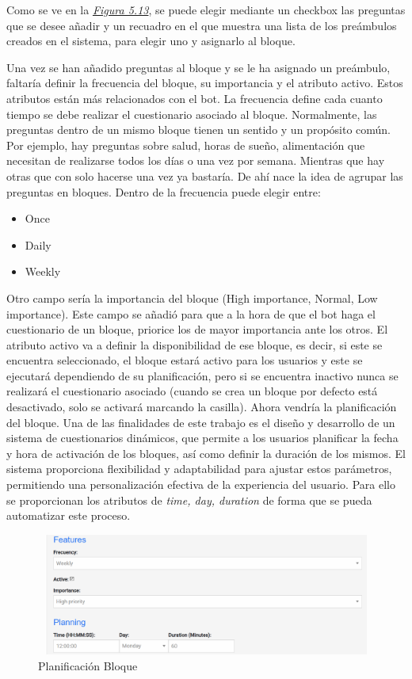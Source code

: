 Como se ve en la \textit{\hyperref[fig:add-bloque]{Figura 5.13}}, se puede elegir mediante un checkbox las preguntas que se desee añadir y un recuadro en el que  muestra una lista de los preámbulos creados en el sistema, para elegir uno y asignarlo al bloque.


Una vez se han añadido preguntas al bloque y se le ha asignado un preámbulo, faltaría definir la frecuencia del bloque, su importancia y el atributo activo. Estos atributos están más relacionados con el bot. La frecuencia define cada cuanto tiempo se debe realizar el cuestionario asociado al bloque. Normalmente, las preguntas dentro de un mismo bloque tienen un sentido y un propósito común. Por ejemplo, hay preguntas sobre salud, horas de sueño, alimentación que necesitan de realizarse todos los días o una vez por semana. Mientras que hay otras que con solo hacerse una vez ya bastaría. De ahí nace la idea de agrupar las preguntas en bloques. Dentro de la frecuencia puede elegir entre:

\begin{itemize}
    \item Once
    \item Daily
    \item Weekly
\end{itemize}

Otro campo sería la importancia del bloque (High importance, Normal, Low importance). Este campo  se añadió para que a la hora de que el bot haga el cuestionario de un bloque, priorice los de mayor importancia ante los otros. El atributo activo va a definir la disponibilidad de ese bloque, es decir, si este se encuentra seleccionado, el bloque estará activo para los usuarios y este se ejecutará dependiendo de su planificación, pero si se encuentra inactivo nunca se realizará el cuestionario asociado (cuando se crea un bloque por defecto está desactivado, solo se activará marcando la casilla). Ahora vendría la planificación del bloque. Una de las finalidades de este trabajo es el diseño y desarrollo de un sistema de cuestionarios dinámicos, que permite a los usuarios planificar la fecha y hora de activación de los bloques, así como definir la duración de los mismos. El sistema proporciona flexibilidad y adaptabilidad para ajustar estos parámetros, permitiendo una personalización efectiva de la experiencia del usuario. Para ello se proporcionan los atributos de \textit{time, day, duration} de forma que se pueda automatizar este proceso. 


\begin{figure}[!ht]
    \centering
    \includegraphics[width=1\textwidth, height=4cm]{imagenes/plan_bloque.png}
    \caption{Planificación Bloque}
    \label{fig:planificacion_bloque}
\end{figure}

